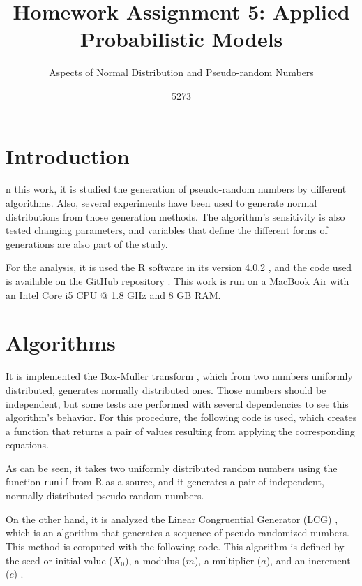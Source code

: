 \documentclass[10pt,leter,openany]{article}
\author{5273}
\title{Homework Assignment 5: Applied Probabilistic Models}
\subtitle{Aspects of Normal Distribution and Pseudo-random Numbers }
\date{}
\begin{document}
	
\maketitle

\section{Introduction}
	
	n this work, it is studied the generation of pseudo-random numbers by different algorithms. Also, several experiments have been used to generate normal distributions from those generation methods. The algorithm's sensitivity is also tested changing parameters, and variables that define the different forms of generations are also part of the study.
	
	For the analysis, it is used the R software in its version 4.0.2 \citep{r}, and the code used is available on the GitHub repository \citep{github}. This work is run on a MacBook Air with an Intel Core i5 CPU $ @ $ 1.8 GHz and 8 GB RAM.
	
\section{Algorithms}
	 
	It is implemented the Box-Muller transform \citep{box1958note}, which from two numbers uniformly distributed, generates normally distributed ones. Those numbers should be independent, but some tests are performed with several dependencies to see this algorithm's behavior. For this procedure, the following code is used, which creates a function that returns a pair of values resulting from applying the corresponding equations. 
	
	
	
	As can be seen, it takes two uniformly distributed random numbers using the function \texttt{runif} from R as a source, and it generates a pair of independent, normally distributed pseudo-random numbers.
	
	On the other hand, it is analyzed the Linear Congruential Generator (LCG) \citep{l2017history}, which is an algorithm that generates a sequence of pseudo-randomized numbers. This method is computed with the following code. This algorithm is defined by the seed or initial value ($X_{0}) $, a modulus ($m$), a multiplier ($a$), and an increment ($c$) . 
	
	
	
\end{document}
